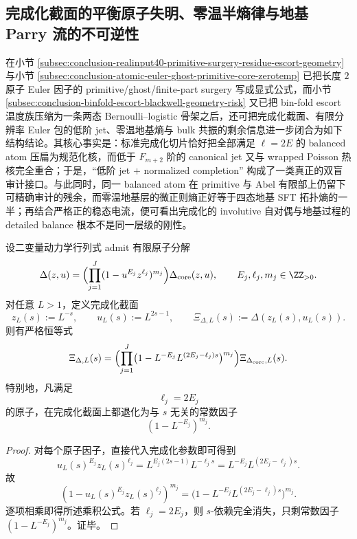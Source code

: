 \subsection{完成化截面的平衡原子失明、零温半熵律与地基 Parry 流的不可逆性}\label{subsec:conclusion-completed-slice-atomblind-groundstate-escort-current}
在小节 \ref{subsec:conclusion-realinput40-primitive-surgery-residue-escort-geometry} 与小节 \ref{subsec:conclusion-atomic-euler-ghost-primitive-core-zerotemp} 已把长度 \(2\) 原子 Euler 因子的 primitive/ghost/finite-part surgery 写成显式公式，而小节 \ref{subsec:conclusion-binfold-escort-blackwell-geometry-risk} 又已把 bin-fold escort 温度族压缩为一条两态 Bernoulli--logistic 骨架之后，还可把完成化截面、有限分辨率 Euler 包的低阶 jet、零温地基熵与 bulk 共振的剩余信息进一步闭合为如下结构结论。其核心事实是：标准完成化切片恰好把全部满足 \(\ell=2E\) 的 balanced atom 压扁为规范化核，而低于 \(F_{m+2}\) 阶的 canonical jet 又与 wrapped Poisson 热核完全重合；于是，``低阶 jet \(+\) normalized completion'' 构成了一类真正的双盲审计接口。与此同时，同一 balanced atom 在 primitive 与 Abel 有限部上仍留下可精确审计的残余，而零温地基层的微正则熵正好等于四态地基 SFT 拓扑熵的一半；再结合严格正的稳态电流，便可看出完成化的 involutive 自对偶与地基过程的 detailed balance 根本不是同一层级的刚性。

\begin{theorem}[完成化截面对平衡原子的常数化失明]\label{thm:conclusion-completed-slice-balanced-atoms-become-constants}
设二变量动力学行列式 admit 有限原子分解
\[
\Delta(z,u)
=
\Bigl(\prod_{j=1}^{J}(1-u^{E_j}z^{\ell_j})^{m_j}\Bigr)\Delta_{\mathrm{core}}(z,u),
\qquad
E_j,\ell_j,m_j\in\ZZ_{>0}.
\]
对任意 \(L>1\)，定义完成化截面
\[
z_L(s):=L^{-s},
\qquad
u_L(s):=L^{2s-1},
\qquad
\Xi_{\Delta,L}(s):=\Delta(z_L(s),u_L(s)).
\]
则有严格恒等式
\[
\Xi_{\Delta,L}(s)
=
\Bigl(\prod_{j=1}^{J}\bigl(1-L^{-E_j}L^{(2E_j-\ell_j)s}\bigr)^{m_j}\Bigr)
\Xi_{\Delta_{\mathrm{core}},L}(s).
\]
特别地，凡满足
\[
\ell_j=2E_j
\]
的原子，在完成化截面上都退化为与 \(s\) 无关的常数因子
\[
(1-L^{-E_j})^{m_j}.
\]
\end{theorem}
\begin{proof}
对每个原子因子，直接代入完成化参数即可得到
\[
u_L(s)^{E_j}z_L(s)^{\ell_j}
=
L^{E_j(2s-1)}L^{-\ell_j s}
=
L^{-E_j}L^{(2E_j-\ell_j)s}.
\]
故
\[
(1-u_L(s)^{E_j}z_L(s)^{\ell_j})^{m_j}
=
\bigl(1-L^{-E_j}L^{(2E_j-\ell_j)s}\bigr)^{m_j}.
\]
逐项相乘即得所述乘积公式。若 \(\ell_j=2E_j\)，则 \(s\)-依赖完全消失，只剩常数因子 \((1-L^{-E_j})^{m_j}\)。证毕。
\end{proof}

